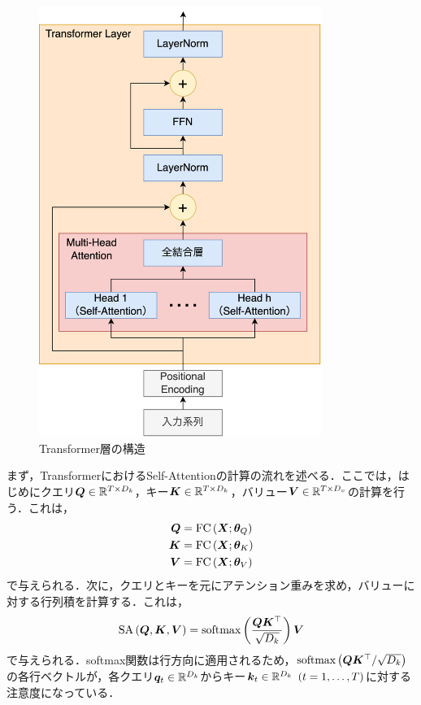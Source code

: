 \begin{figure}[bt]
    \centering
    \includegraphics[height=140mm]{./figure/sec3/transformer.drawio.png}
    \caption{Transformer層の構造}
    \label{sec3:fig:transformer_layer}
\end{figure}

まず，TransformerにおけるSelf-Attentionの計算の流れを述べる．ここでは，はじめにクエリ$\bm{Q} \in \mathbb{R}^{T \times D_{k}}$，キー$\bm{K} \in \mathbb{R}^{T \times D_{k}}$，バリュー$\bm{V} \in \mathbb{R}^{T \times D_{v}}$の計算を行う．これは，
\begin{align}
    \bm{Q} & = \text{FC}\left(\bm{X}; \bm{\theta}_{Q}\right) \\
    \bm{K} & = \text{FC}\left(\bm{X}; \bm{\theta}_{K}\right) \\
    \bm{V} & = \text{FC}\left(\bm{X}; \bm{\theta}_{V}\right)
\end{align}
で与えられる．次に，クエリとキーを元にアテンション重みを求め，バリューに対する行列積を計算する．これは，
\begin{equation}
    \text{SA}\left(\bm{Q}, \bm{K}, \bm{V}\right) = \text{softmax}\left(\frac{\bm{Q}\bm{K}^\top}{\sqrt{D_{k}}}\right) \bm{V}
\end{equation}
で与えられる．softmax関数は行方向に適用されるため，$\text{softmax}\left(\bm{Q}\bm{K}^\top / \sqrt{D_{k}}\right)$の各行ベクトルが，各クエリ$\bm{q}_{t} \in \mathbb{R}^{D_{k}}$からキー$\bm{k}_{t} \in \mathbb{R}^{D_{k}} ~ \left(t = 1, \ldots, T\right)$に対する注意度になっている．

